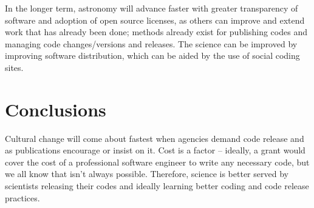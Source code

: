 \documentclass[11pt,twoside]{article}
\begin{document}
In the longer term, astronomy will advance faster with greater transparency of software and adoption of open source licenses, as others can improve and extend work that has already been done; methods already exist for publishing codes and managing code changes/versions and releases. The science can be improved by improving software distribution, which can be aided by the use of social coding sites.

\section{Conclusions}

Cultural change will come about fastest when agencies demand code release and as publications encourage or insist on it. Cost is a factor -- ideally, a grant would cover the cost of a professional software engineer to write any necessary code, but we all know that isn't always possible. Therefore, science is better served by scientists releasing their codes and ideally learning better coding and code release practices.




\end{document}
